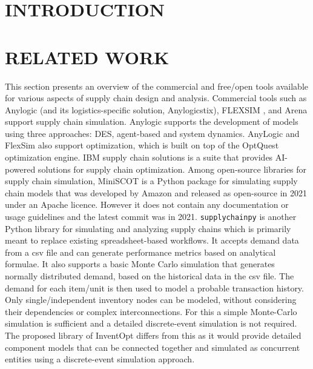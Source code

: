 \documentclass[a4paper,twoside]{article}
\begin{document}
\onecolumn \maketitle \normalsize \setcounter{footnote}{0} \vfill

\section{\uppercase{Introduction}}
\label{sec:introduction}


\section{\uppercase{Related Work}}
\label{sec:relatedwork}
This section presents an overview of the commercial and free/open tools available for various aspects of supply chain design and analysis. Commercial tools such as Anylogic \cite{Anylogic} (and its logistics-specific solution, Anylogicstix),  FLEXSIM \cite{Flexsim}, and Arena \cite{Arena} support supply chain simulation. Anylogic supports the development of models using three approaches: DES, agent-based and system dynamics. AnyLogic and FlexSim also support optimization, which is built on top of the OptQuest \cite{OptQuest} optimization engine.  IBM supply chain solutions \cite{IBM} is a suite that provides AI-powered solutions for supply chain optimization. 
%
Among open-source libraries for supply chain simulation, MiniSCOT  \cite{miniSCOT} is a Python package for simulating supply chain models that was developed by Amazon and released as open-source in 2021 under an Apache licence. However it does not contain any documentation or usage guidelines and the latest commit was in 2021. \texttt{supplychainpy} \cite{Supplychainpy} is another Python library for simulating and analyzing supply chains which is primarily meant to replace existing spreadsheet-based workflows. It accepts demand data from a csv file and can generate performance metrics based on analytical formulae. It also supports a basic Monte Carlo simulation that generates normally distributed demand, based on the historical data in the csv file. The demand for each item/unit is then used to model a probable transaction history. Only single/independent inventory nodes can be modeled, without considering their dependencies or complex interconnections. For this a simple Monte-Carlo simulation is sufficient and a detailed discrete-event simulation is not required. The proposed library of InventOpt differs from this as it would provide detailed component models that can be connected together and simulated as concurrent entities using a discrete-event simulation approach.
\end{document}
